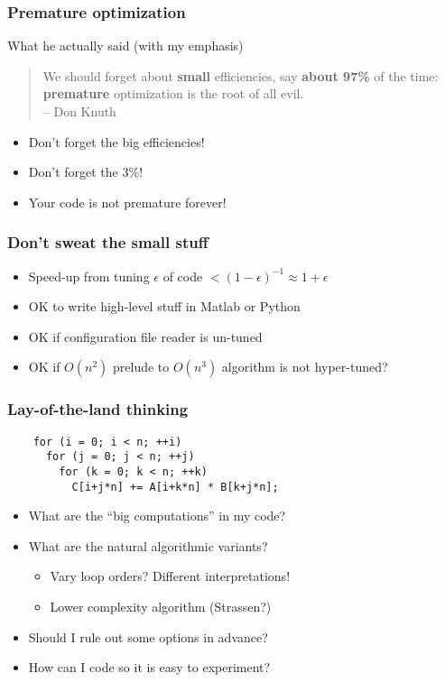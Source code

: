\documentclass{beamer}
\begin{document}
\begin{frame}
  \frametitle{Premature optimization}

  What he actually said (with my emphasis)
  \begin{quote}
  We should forget about {\bf small} efficiencies, say {\bf about 97\%} of the
  time: {\bf premature} optimization is the root of all evil. \\
  \hfill -- Don Knuth
  \end{quote}

  \begin{itemize}
  \item Don't forget the big efficiencies!
  \item Don't forget the 3\%!
  \item Your code is not premature forever!
  \end{itemize}
\end{frame}


\begin{frame}
  \frametitle{Don't sweat the small stuff}

  \begin{itemize}
  \item Speed-up from tuning $\epsilon$ of code $< (1-\epsilon)^{-1}
    \approx 1 + \epsilon$
  \item OK to write high-level stuff in Matlab or Python
  \item OK if configuration file reader is un-tuned
  \item OK if $O(n^2)$ prelude to $O(n^3)$ algorithm is not hyper-tuned?
  \end{itemize}
\end{frame}


\begin{frame}[fragile]
  \frametitle{Lay-of-the-land thinking}

  \begin{lstlisting}
    for (i = 0; i < n; ++i)
      for (j = 0; j < n; ++j)
        for (k = 0; k < n; ++k)
          C[i+j*n] += A[i+k*n] * B[k+j*n];
  \end{lstlisting}
  \begin{itemize}
  \item What are the ``big computations'' in my code?
  \item What are the natural algorithmic variants?
    \begin{itemize}
    \item Vary loop orders?  Different interpretations!
    \item Lower complexity algorithm (Strassen?)
    \end{itemize}
  \item Should I rule out some options in advance?
  \item How can I code so it is easy to experiment?
  \end{itemize}
\end{frame}
\end{document}
